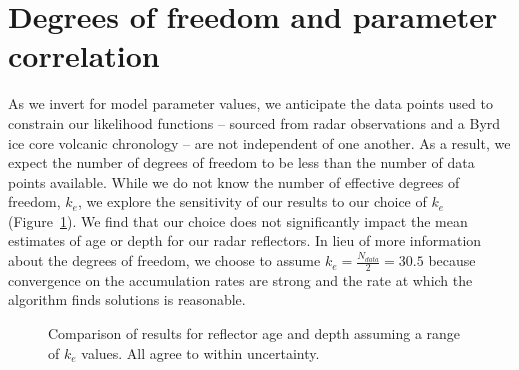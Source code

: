 





\section{Degrees of freedom and parameter correlation}\label{sec:ke}

As we invert for model parameter values, we anticipate the data points used to constrain our likelihood functions -- sourced from radar observations and a Byrd ice core volcanic chronology -- are not independent of one another. As a result, we expect the number of degrees of freedom to be less than the number of data points available. While we do not know the number of effective degrees of freedom, $k_e$, we explore the sensitivity of our results to our choice of $k_e$ (Figure~\ref{fig:ke}). We find that our choice does not significantly impact the mean estimates of age or depth for our radar reflectors. In lieu of more information about the degrees of freedom, we choose to assume $k_e = \frac{N_{data}}{2} = 30.5$ because convergence on the accumulation rates are strong and the rate at which the algorithm finds solutions is reasonable. 

\begin{figure}[ht]
\begin{center}
{}
\caption[scale=0.3]{Comparison of results for reflector age and depth assuming a range of $k_e$ values. All agree to within uncertainty.}
\end{center}
\label{fig:ke}
\end{figure}

